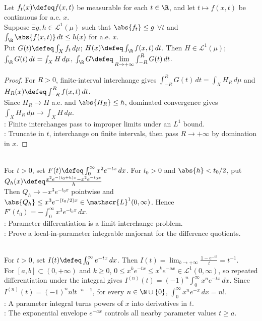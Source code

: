\begin{corollary} \label{cor:improper-riemann-parameter-integral-interchange} \\
Let $f_t(x)\defeq f(x,t)$ be measurable for each $t\in\R$, and let $t\mapsto f(x,t)$ be continuous for a.e. $x$.\\
Suppose $\exists g,h\in\mathscr{L}^1(\mu)$ such that $\abs{f_t}\leq g$ $\forall t$ and $\int_\R\abs{f(x,t)}\,dt\leq h(x)$ for a.e. $x$.\\
Put $G(t)\defeq\int_Xf_t\,d\mu$; $H(x)\defeq\int_\R f(x,t)\,dt$. Then $H\in\mathscr{L}^1(\mu)$; $\int_\R G(t)\,dt=\int_XH\,d\mu$, $\int_\R G\defeq\lim\limits_{R\to+\infty}\int_{-R}^{R}G(t)\,dt$.
\begin{proof}
For $R>0$, finite-interval interchange gives $\int_{-R}^{R}G(t)\,dt=\int_XH_R\,d\mu$ and $H_R(x)\defeq\int_{-R}^{R}f(x,t)\,dt$.\\
Since $H_R\to H$ a.e. and $\abs{H_R}\leq h$, dominated convergence gives $\int_XH_R\,d\mu\to\int_XH\,d\mu$.\\
: Finite interchanges pass to improper limits under an $L^1$ bound.\\
: Truncate in $t$, interchange on finite intervals, then pass $R\to+\infty$ by domination in $x$.
\end{proof}
\end{corollary}

\begin{example} \label{ex:differentiating-under-integral-dominated-convergence} \\
For $t>0$, set $F(t)\defeq\int_0^\infty x^2e^{-tx}\,dx$. For $t_0>0$ and $\abs{h}<t_0/2$, put $Q_h(x)\defeq\frac{x^2e^{-(t_0+h)x}-x^2e^{-t_0x}}{h}$\\
Then $Q_h\to -x^3e^{-t_0x}$ pointwise and $\abs{Q_h}\leq x^3e^{-(t_0/2)x}\in\mathscr{L}^1(0,\infty)$. Hence $F'(t_0)=-\int_0^\infty x^3e^{-t_0x}\,dx$.\\
: Parameter differentiation is a limit-interchange problem.\\
: Prove a local-in-parameter integrable majorant for the difference quotients.
\end{example}

\begin{example} \label{ex:laplace-transform-powers-factorials} \\
For $t>0$, set $I(t)\defeq\int_0^\infty e^{-tx}\,dx$. Then $I(t)=\lim_{b\to+\infty}\frac{1-e^{-tb}}{t}=t^{-1}$.\\
For $[a,b]\subset(0,+\infty)$ and $k\geq0$, $0\leq x^ke^{-tx}\leq x^ke^{-ax}\in\mathscr{L}^1(0,\infty)$, so repeated differentiation under the integral gives $I^{(n)}(t)=(-1)^n\int_0^\infty x^ne^{-tx}\,dx$. Since $I^{(n)}(t)=(-1)^nn!t^{-n-1}$, for every $n\in\N\cup\{0\}$, $\int_0^\infty x^ne^{-x}\,dx=n!$.\\
: A parameter integral turns powers of $x$ into derivatives in $t$.\\
: The exponential envelope $e^{-ax}$ controls all nearby parameter values $t\geq a$.
\end{example}
